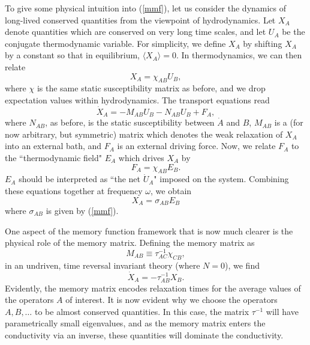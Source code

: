 \documentclass[10pt, oneside]{book}
\begin{document}
\begin{doublespace}
To give some physical intuition into (\ref{mmf}), let us consider the dynamics of long-lived conserved quantities from the viewpoint of hydrodynamics.   Let $X_A$ denote quantities which are conserved on very long time scales, and let $U_A$ be the conjugate thermodynamic variable.   For simplicity, we define $X_A$ by shifting $X_A$ by a constant so that in equilibrium, $\langle X_A\rangle = 0$.  In thermodynamics, we can then relate \begin{equation}
X_A = \chi_{AB}U_B,
\end{equation}where $\chi$ is the same static susceptibility matrix as before, and we drop expectation values within hydrodynamics.    The transport equations read \begin{equation}
\dot{X}_A = -M_{AB}U_B -N_{AB}U_B + F_A,  \label{dxadt}
\end{equation}where $N_{AB}$, as before, is the static susceptibility between $\dot{A}$ and $B$, $M_{AB}$ is a (for now arbitrary, but symmetric) matrix which denotes the weak relaxation of $X_A$ into an external bath, and $F_A$ is an external driving force.    Now, we relate $F_A$ to the ``thermodynamic field" $E_A$ which drives $X_A$ by \begin{equation}
F_A = \chi_{AB}E_B.
\end{equation}
$E_A$ should be interpreted as  ``the net $\dot{U}_A$" imposed on the system.   Combining these equations together at frequency $\omega$, we obtain \begin{equation}
X_A = \sigma_{AB}E_B
\end{equation}where $\sigma_{AB}$ is given by (\ref{mmf}). 

One aspect of the memory function framework  that  is now much clearer is the physical role of the memory matrix.   Defining the memory matrix as \begin{equation}
M_{AB} \equiv \tau^{-1}_{AC} \chi_{CB},
\end{equation}in an undriven, time reversal invariant theory (where $N=0$), we find \begin{equation}
\dot{X}_A = -\tau^{-1}_{AB} X_B.
\end{equation}Evidently, the memory matrix encodes relaxation times for the average values of the operators $A$ of interest.   It is now evident why we choose the operators $A,B,\ldots$ to be almost conserved quantities.   In this case, the matrix $\tau^{-1}$ will have parametrically small eigenvalues, and as the memory matrix enters the conductivity via an inverse, these quantities will dominate the conductivity.


\end{doublespace}
\end{document}
